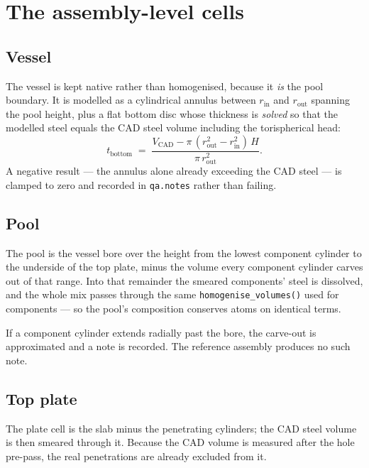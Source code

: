 \documentclass[9pt,a4paper]{extarticle}
\newcommand{\code}[1]{\texttt{\small #1}}
\begin{document}
\section{The assembly-level cells}

\subsection{Vessel}

The vessel is kept native rather than homogenised, because it \emph{is} the pool
boundary. It is modelled as a cylindrical annulus between $r_{\mathrm{in}}$ and
$r_{\mathrm{out}}$ spanning the pool height, plus a flat bottom disc whose
thickness is \emph{solved} so that the modelled steel equals the CAD steel
volume including the torispherical head:
\[
t_{\mathrm{bottom}} \;=\;
  \frac{V_{\mathrm{CAD}} - \pi\,(r_{\mathrm{out}}^2-r_{\mathrm{in}}^2)\,H}
       {\pi\,r_{\mathrm{out}}^2} .
\]
A negative result --- the annulus alone already exceeding the CAD steel --- is
clamped to zero and recorded in \code{qa.notes} rather than failing.

\subsection{Pool}

The pool is the vessel bore over the height from the lowest component cylinder
to the underside of the top plate, minus the volume every component cylinder
carves out of that range. Into that remainder the smeared components' steel is
dissolved, and the whole mix passes through the same
\code{homogenise\_volumes()} used for components --- so the pool's composition
conserves atoms on identical terms.

If a component cylinder extends radially past the bore, the carve-out is
approximated and a note is recorded. The reference assembly produces no such
note.

\subsection{Top plate}

The plate cell is the slab minus the penetrating cylinders; the CAD steel volume
is then smeared through it. Because the CAD volume is measured after the hole
pre-pass, the real penetrations are already excluded from it.
\end{document}
